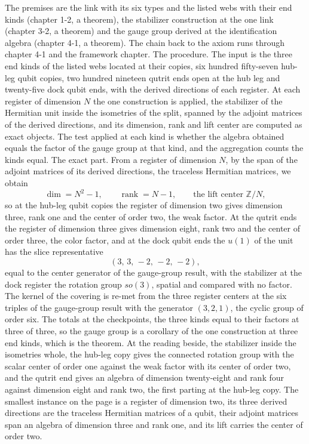 \begin{chproof}
The premises are the link with its six types and the listed webs with their end kinds (chapter 1-2, a theorem), the stabilizer construction at the one link (chapter 3-2, a theorem) and the gauge group derived at the identification algebra (chapter 4-1, a theorem). The chain back to the axiom runs through chapter 4-1 and the framework chapter. The procedure. The input is the three end kinds of the listed webs located at their copies, six hundred fifty-seven hub-leg qubit copies, two hundred nineteen qutrit ends open at the hub leg and twenty-five dock qubit ends, with the derived directions of each register. At each register of dimension $N$ the one construction is applied, the stabilizer of the Hermitian unit inside the isometries of the split, spanned by the adjoint matrices of the derived directions, and its dimension, rank and lift center are computed as exact objects. The test applied at each kind is whether the algebra obtained equals the factor of the gauge group at that kind, and the aggregation counts the kinds equal. The exact part. From a register of dimension $N$, by the span of the adjoint matrices of its derived directions, the traceless Hermitian matrices, we obtain
\begin{equation}
\dim = N^{2}-1,\qquad \operatorname{rank} = N-1,\qquad \text{the lift center } \mathbb{Z}/N ,
\end{equation}
so at the hub-leg qubit copies the register of dimension two gives dimension three, rank one and the center of order two, the weak factor. At the qutrit ends the register of dimension three gives dimension eight, rank two and the center of order three, the color factor, and at the dock qubit ends the $u(1)$ of the unit has the slice representative
\begin{equation}
(3,\,3,\,-2,\,-2,\,-2) ,
\end{equation}
equal to the center generator of the gauge-group result, with the stabilizer at the dock register the rotation group $so(3)$, spatial and compared with no factor. The kernel of the covering is re-met from the three register centers at the six triples of the gauge-group result with the generator $(3,2,1)$, the cyclic group of order six. The totals at the checkpoints, the three kinds equal to their factors at three of three, so the gauge group is a corollary of the one construction at three end kinds, which is the theorem. At the reading beside, the stabilizer inside the isometries whole, the hub-leg copy gives the connected rotation group with the scalar center of order one against the weak factor with its center of order two, and the qutrit end gives an algebra of dimension twenty-eight and rank four against dimension eight and rank two, the first parting at the hub-leg copy. The smallest instance on the page is a register of dimension two, its three derived directions are the traceless Hermitian matrices of a qubit, their adjoint matrices span an algebra of dimension three and rank one, and its lift carries the center of order two.


\end{chproof}
